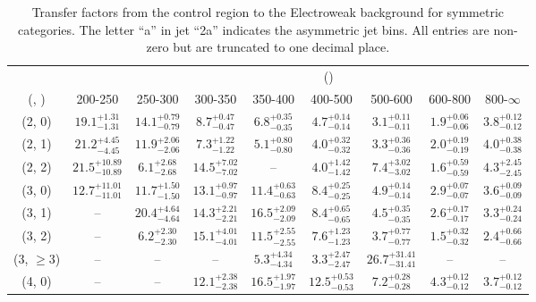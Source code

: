 \begin{table}[h!]
\tiny
\centering
\caption{Transfer factors from the \mmj control region to the Electroweak background for symmetric categories. The letter ``a'' in jet \eg ``2a''  indicates the asymmetric jet bins. All entries are non-zero but are truncated to one decimal place.\label{tab:tf_mumu_total_sym}}
\begin{tabular}
{ccccccccc}
	\hline\hline
&	& \multicolumn{8}{c}{\scalht (\gev)} \\ 
	 (\njet,  \nb) & 200-250 & 250-300 & 300-350 & 350-400 & 400-500 & 500-600 & 600-800 & 800-$\infty$ \\ [0.8ex] 
\hline
	(2, 0) & $19.1^{+ 1.31 }_{- 1.31 }$ & $14.1^{+ 0.79 }_{- 0.79 }$ & $8.7^{+ 0.47 }_{- 0.47 }$ & $6.8^{+ 0.35 }_{- 0.35 }$ & $4.7^{+ 0.14 }_{- 0.14 }$ & $3.1^{+ 0.11 }_{- 0.11 }$ & $1.9^{+ 0.06 }_{- 0.06 }$ & $3.8^{+ 0.12 }_{- 0.12 }$ \\[0.5ex] 
	(2, 1) & $21.2^{+ 4.45 }_{- 4.45 }$ & $11.9^{+ 2.06 }_{- 2.06 }$ & $7.3^{+ 1.22 }_{- 1.22 }$ & $5.1^{+ 0.80 }_{- 0.80 }$ & $4.0^{+ 0.32 }_{- 0.32 }$ & $3.3^{+ 0.36 }_{- 0.36 }$ & $2.0^{+ 0.19 }_{- 0.19 }$ & $4.0^{+ 0.38 }_{- 0.38 }$ \\[0.5ex] 
	(2, 2) & $21.5^{+ 10.89 }_{- 10.89 }$ & $6.1^{+ 2.68 }_{- 2.68 }$ & $14.5^{+ 7.02 }_{- 7.02 }$ & -- & $4.0^{+ 1.42 }_{- 1.42 }$ & $7.4^{+ 3.02 }_{- 3.02 }$ & $1.6^{+ 0.59 }_{- 0.59 }$ & $4.3^{+ 2.45 }_{- 2.45 }$ \\[0.5ex] 
	(3, 0) & $12.7^{+ 11.01 }_{- 11.01 }$ & $11.7^{+ 1.50 }_{- 1.50 }$ & $13.1^{+ 0.97 }_{- 0.97 }$ & $11.4^{+ 0.63 }_{- 0.63 }$ & $8.4^{+ 0.25 }_{- 0.25 }$ & $4.9^{+ 0.14 }_{- 0.14 }$ & $2.9^{+ 0.07 }_{- 0.07 }$ & $3.6^{+ 0.09 }_{- 0.09 }$ \\[0.5ex] 
	(3, 1) & -- & $20.4^{+ 4.64 }_{- 4.64 }$ & $14.3^{+ 2.21 }_{- 2.21 }$ & $16.5^{+ 2.09 }_{- 2.09 }$ & $8.4^{+ 0.65 }_{- 0.65 }$ & $4.5^{+ 0.35 }_{- 0.35 }$ & $2.6^{+ 0.17 }_{- 0.17 }$ & $3.3^{+ 0.24 }_{- 0.24 }$ \\[0.5ex] 
	(3, 2) & -- & $6.2^{+ 2.30 }_{- 2.30 }$ & $15.1^{+ 4.01 }_{- 4.01 }$ & $11.5^{+ 2.55 }_{- 2.55 }$ & $7.6^{+ 1.23 }_{- 1.23 }$ & $3.7^{+ 0.77 }_{- 0.77 }$ & $1.5^{+ 0.32 }_{- 0.32 }$ & $2.4^{+ 0.66 }_{- 0.66 }$ \\[0.5ex] 
	(3, $\ge3$) & -- & -- & -- & $5.3^{+ 4.34 }_{- 4.34 }$ & $3.3^{+ 2.47 }_{- 2.47 }$ & $26.7^{+ 31.41 }_{- 31.41 }$ & -- & -- \\[0.5ex] 
	(4, 0) & -- & -- & $12.1^{+ 2.38 }_{- 2.38 }$ & $16.5^{+ 1.97 }_{- 1.97 }$ & $12.5^{+ 0.53 }_{- 0.53 }$ & $7.2^{+ 0.28 }_{- 0.28 }$ & $4.3^{+ 0.12 }_{- 0.12 }$ & $3.7^{+ 0.12 }_{- 0.12 }$ \\[0.5ex] 

\end{tabular}
\end{table}
